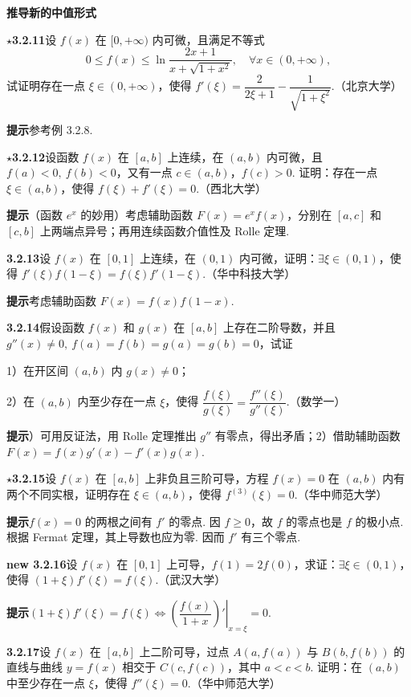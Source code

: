 \documentclass[UTF8,12pt,a4paper,fontset=fandol]{ctexart}
\begin{document}
\noindent\textbf{推导新的中值形式}

\noindent\textbf{$\star$3.2.11}\quad 设 $f(x)$ 在 $[0,+\infty)$ 内可微，且满足不等式
\[
  0\le f(x)\le \ln\frac{2x+1}{x+\sqrt{1+x^2}},\quad \forall x\in(0,+\infty),
\]
试证明存在一点 $\xi\in(0,+\infty)$，使得 $f'(\xi)=\dfrac2{2\xi+1}-\dfrac1{\sqrt{1+\xi^2}}$.（北京大学）

\noindent\textbf{提示}\quad 参考例 3.2.8.

\noindent\textbf{$\star$3.2.12}\quad 设函数 $f(x)$ 在 $[a,b]$ 上连续，在 $(a,b)$ 内可微，且 $f(a)<0,\ f(b)<0$，又有一点 $c\in(a,b)$，$f(c)>0$. 证明：存在一点 $\xi\in(a,b)$，使得 $f(\xi)+f'(\xi)=0$.（西北大学）

\noindent\textbf{提示}\quad （函数 $e^x$ 的妙用）考虑辅助函数 $F(x)=e^xf(x)$，分别在 $[a,c]$ 和 $[c,b]$ 上两端点异号；再用连续函数介值性及 Rolle 定理.

\noindent\textbf{3.2.13}\quad 设 $f(x)$ 在 $[0,1]$ 上连续，在 $(0,1)$ 内可微，证明：$\exists \xi\in(0,1)$，使得 $f'(\xi)f(1-\xi)=f(\xi)f'(1-\xi)$.（华中科技大学）

\noindent\textbf{提示}\quad 考虑辅助函数 $F(x)=f(x)f(1-x)$.

\noindent\textbf{3.2.14}\quad 假设函数 $f(x)$ 和 $g(x)$ 在 $[a,b]$ 上存在二阶导数，并且 $g''(x)\ne0,\ f(a)=f(b)=g(a)=g(b)=0$，试证

1）在开区间 $(a,b)$ 内 $g(x)\ne0$；

2）在 $(a,b)$ 内至少存在一点 $\xi$，使得 $\dfrac{f(\xi)}{g(\xi)}=\dfrac{f''(\xi)}{g''(\xi)}$.（数学一）

\noindent\textbf{提示}）可用反证法，用 Rolle 定理推出 $g''$ 有零点，得出矛盾；2）借助辅助函数 $F(x)=f(x)g' (x)-f'(x)g(x)$.

\noindent\textbf{$\star$3.2.15}\quad 设 $f(x)$ 在 $[a,b]$ 上非负且三阶可导，方程 $f(x)=0$ 在 $(a,b)$ 内有两个不同实根，证明存在 $\xi\in(a,b)$，使得 $f^{(3)}(\xi)=0$.（华中师范大学）

\noindent\textbf{提示}\quad $f(x)=0$ 的两根之间有 $f'$ 的零点. 因 $f\ge0$，故 $f$ 的零点也是 $f$ 的极小点. 根据 Fermat 定理，其上导数也应为零. 因而 $f'$ 有三个零点.

\noindent\textbf{new 3.2.16}\quad 设 $f(x)$ 在 $[0,1]$ 上可导，$f(1)=2f(0)$，求证：$\exists \xi\in(0,1)$，使得 $(1+\xi)f'(\xi)=f(\xi)$.（武汉大学）

\noindent\textbf{提示}\quad $(1+\xi)f'(\xi)=f(\xi)\Leftrightarrow \left.\left(\dfrac{f(x)}{1+x}\right)'\right|_{x=\xi}=0$.

\noindent\textbf{3.2.17}\quad 设 $f(x)$ 在 $[a,b]$ 上二阶可导，过点 $A(a,f(a))$ 与 $B(b,f(b))$ 的直线与曲线 $y=f(x)$ 相交于 $C(c,f(c))$，其中 $a<c<b$. 证明：在 $(a,b)$ 中至少存在一点 $\xi$，使得 $f''(\xi)=0$.（华中师范大学）
\end{document}
